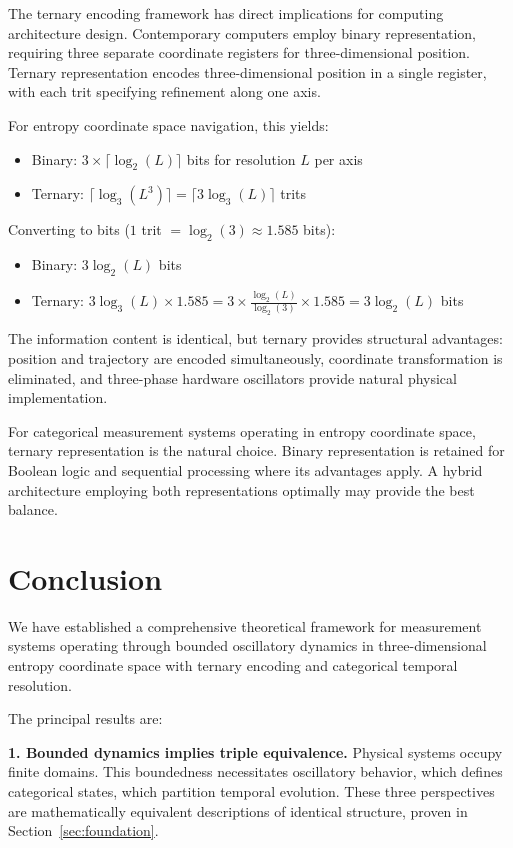 \documentclass[11pt,a4paper]{article}
\theoremstyle{remark}
\begin{document}
The ternary encoding framework has direct implications for computing architecture design. Contemporary computers employ binary representation, requiring three separate coordinate registers for three-dimensional position. Ternary representation encodes three-dimensional position in a single register, with each trit specifying refinement along one axis.

For entropy coordinate space navigation, this yields:
\begin{itemize}
\item Binary: $3 \times \lceil \log_2(L) \rceil$ bits for resolution $L$ per axis
\item Ternary: $\lceil \log_3(L^3) \rceil = \lceil 3\log_3(L) \rceil$ trits
\end{itemize}

Converting to bits ($1$ trit $= \log_2(3) \approx 1.585$ bits):
\begin{itemize}
\item Binary: $3\log_2(L)$ bits
\item Ternary: $3\log_3(L) \times 1.585 = 3 \times \frac{\log_2(L)}{\log_2(3)} \times 1.585 = 3\log_2(L)$ bits
\end{itemize}

The information content is identical, but ternary provides structural advantages: position and trajectory are encoded simultaneously, coordinate transformation is eliminated, and three-phase hardware oscillators provide natural physical implementation.

For categorical measurement systems operating in entropy coordinate space, ternary representation is the natural choice. Binary representation is retained for Boolean logic and sequential processing where its advantages apply. A hybrid architecture employing both representations optimally may provide the best balance.

\section{Conclusion}
\label{sec:conclusion}

We have established a comprehensive theoretical framework for measurement systems operating through bounded oscillatory dynamics in three-dimensional entropy coordinate space with ternary encoding and categorical temporal resolution.

The principal results are:

\textbf{1. Bounded dynamics implies triple equivalence.} Physical systems occupy finite domains. This boundedness necessitates oscillatory behavior, which defines categorical states, which partition temporal evolution. These three perspectives are mathematically equivalent descriptions of identical structure, proven in Section~\ref{sec:foundation}.
\end{document}
